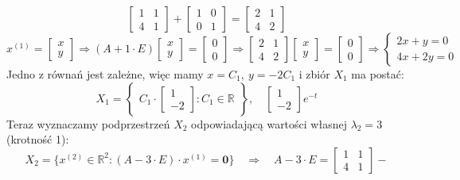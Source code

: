 \begin{przyk}
$$\begin{bmatrix}
1 & 1\\
4 & 1
\end{bmatrix}+
\begin{bmatrix}
1 & 0\\
0 & 1
\end{bmatrix}=
\begin{bmatrix}
2 & 1\\
4 & 2
\end{bmatrix}$$
$$x^{(1)}=\begin{bmatrix}
x\\
y
\end{bmatrix}\Rightarrow (A+1\cdot E)
\begin{bmatrix}
x\\
y
\end{bmatrix}=
\begin{bmatrix}
0\\
0
\end{bmatrix}\Rightarrow
\begin{bmatrix}
2 & 1\\
4 & 2
\end{bmatrix}
\begin{bmatrix}
x\\
y
\end{bmatrix}=
\begin{bmatrix}
0\\
0
\end{bmatrix}\Rightarrow
\left\{\begin{array}{l}
2x+y=0\\
4x+2y=0
\end{array}\right.$$
Jedno z równań jest zależne, więc mamy $x=C_1,\ y=-2C_1$ i zbiór $X_1$ ma postać: $$X_1=
\left\{\begin{array}{c}
C_1\cdot
\begin{bmatrix}
1\\
-2
\end{bmatrix}:C_1\in\mathbb{R}
\end{array}\right\},\quad 
\begin{bmatrix}
1\\
-2
\end{bmatrix}e^{-t}$$
Teraz wyznaczamy podprzestrzeń $X_2$ odpowiadającą wartości własnej $\lambda_2=3$ (krotność 1):$$X_2=\big\{x^{(2)}\in\mathbb{R}^2:(A-3\cdot E)\cdot x^{(1)}=\textbf{0}\big\}\quad\Rightarrow\quad A-3\cdot E=
\begin{bmatrix}
1 & 1\\
4 & 1
\end{bmatrix}-
$$
\end{przyk}
